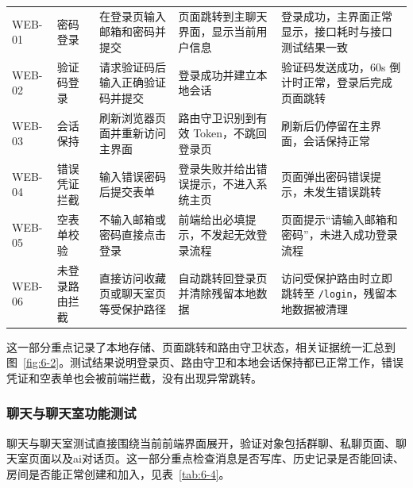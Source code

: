 \renewcommand{\arraystretch}{1.08}
\setlength{\tabcolsep}{0.55ex}
\small
\begin{longtable}{M{0.12\textwidth}p{0.16\textwidth}p{0.18\textwidth}p{0.18\textwidth}p{0.23\textwidth}}
WEB-01 & 密码登录 & 在登录页输入邮箱和密码并提交 & 页面跳转到主聊天界面，显示当前用户信息 & 登录成功，主界面正常显示，接口耗时与接口测试结果一致 \\
WEB-02 & 验证码登录 & 请求验证码后输入正确验证码并提交 & 登录成功并建立本地会话 & 验证码发送成功，60s 倒计时正常，登录后完成页面跳转 \\
WEB-03 & 会话保持 & 刷新浏览器页面并重新访问主界面 & 路由守卫识别到有效 Token，不跳回登录页 & 刷新后仍停留在主界面，会话保持正常 \\
WEB-04 & 错误凭证拦截 & 输入错误密码后提交表单 & 登录失败并给出错误提示，不进入系统主页 & 页面弹出密码错误提示，未发生错误跳转 \\
WEB-05 & 空表单校验 & 不输入邮箱或密码直接点击登录 & 前端给出必填提示，不发起无效登录流程 & 页面提示“请输入邮箱和密码”，未进入成功登录流程 \\
WEB-06 & 未登录路由拦截 & 直接访问收藏页或聊天室页等受保护路径 & 自动跳转回登录页并清除残留本地数据 & 访问受保护路由时立即跳转至 \texttt{/login}，残留本地数据被清理 \\
\end{longtable}
\normalsize
\FloatBarrier

这一部分重点记录了本地存储、页面跳转和路由守卫状态，相关证据统一汇总到图~\ref{fig:6-2}。测试结果说明登录页、路由守卫和本地会话保持都已正常工作，错误凭证和空表单也会被前端拦截，没有出现异常跳转。

\subsubsection{聊天与聊天室功能测试}

聊天与聊天室测试直接围绕当前前端界面展开，验证对象包括群聊、私聊页面、聊天室页面以及ai对话页。这一部分重点检查消息是否写库、历史记录是否能回读、房间是否能正常创建和加入，见表~\ref{tab:6-4}。

